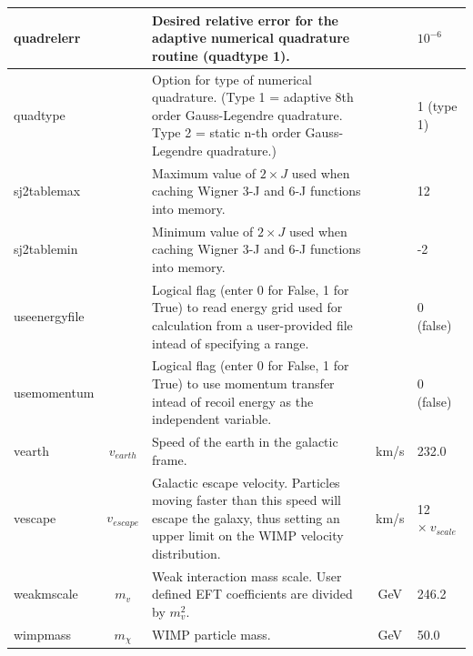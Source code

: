 \documentclass[
14pt, %
a4paper, %
oneside, %
headinclude,footinclude, %
BCOR5mm, %
]{scrartcl}
\begin{document}
\begin{longtable}{| l | c | p{2.5in} | c | l | }
  \hline quadrelerr &  & Desired relative error for the adaptive numerical quadrature routine (quadtype 1).  & & $10^{-6}$\\
  
  \hline quadtype & & Option for type of numerical quadrature. (Type 1 = adaptive 8th order Gauss-Legendre quadrature.  Type 2 = static n-th order Gauss-Legendre quadrature.) && 1 (type 1)\\

  \hline sj2tablemax & & Maximum value of $2\times J$ used when caching Wigner 3-J and 6-J functions into memory. & & 12\\
  
  \hline sj2tablemin & & Minimum value of $2\times J$ used when caching Wigner 3-J and 6-J functions into memory. & & -2\\
  

  \hline useenergyfile & & Logical flag (enter 0 for False, 1 for True) to read energy
  grid used for calculation from a user-provided file intead of specifying a
  range. & & 0 (false) \\

  \hline usemomentum & & Logical flag (enter 0 for False, 1 for True) to use momentum
  transfer intead of recoil energy as the independent variable. & &0 (false) \\

  \hline vearth & $v_{earth}$ & Speed of the earth in the galactic frame. & km/s & 
  232.0\\

  \hline vescape & $v_{escape}$ & Galactic escape velocity. Particles moving faster than
  this speed will escape the galaxy, thus setting an upper limit on the WIMP
  velocity distribution. & km/s & 12 $\times\ v_{scale}$ \\

  \hline weakmscale & $m_v$ & Weak interaction mass scale. User defined EFT coefficients
  are divided by $m_v^2$. & GeV & 246.2 \\

  \hline wimpmass & $m_\chi$ & WIMP particle mass. & GeV & 50.0\\
  \hline
\end{longtable}
\end{document}
